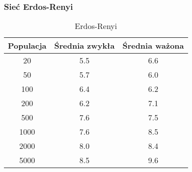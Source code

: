 \subsubsection{Sieć Erdos-Renyi}

\begin{table}[htbp]
    \centering
    \begin{tabular}{c|c|c}
        \hline
        Populacja & Średnia zwykła & Średnia ważona \\
        \hline
        20        & 5.5            & 6.6            \\
        50        & 5.7            & 6.0            \\
        100       & 6.4            & 6.2            \\
        200       & 6.2            & 7.1            \\
        500       & 7.6            & 7.5            \\
        1000      & 7.6            & 8.5            \\
        2000      & 8.0            & 8.4            \\
        5000      & 8.5            & 9.6            \\
    \end{tabular}
    \caption{Erdos-Renyi}
    \label{tab:erdos_renyi}
\end{table}